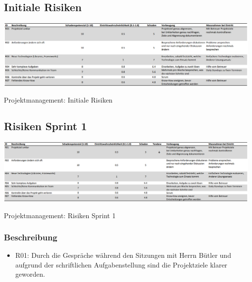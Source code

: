 \begin{landscape}
  \subsection{Initiale Risiken}
  	\begin{table}[H]		
		\includegraphics[width=\linewidth, keepaspectratio]{risiken/Initiales-Risikomanagement.png}
		\caption{Projektmanagement: Initiale Risiken}
	\end{table}
  	\vfill
\end{landscape}
  	   
\begin{landscape}  	   
  \subsection{Risiken Sprint 1}
  	\begin{table}[H]		
  	    \centering	
		\includegraphics[width=\linewidth,keepaspectratio]{risiken/Risiken-Sprint-1.png}
		\caption{Projektmanagement: Risiken Sprint 1}
	\end{table}
	
	\subsubsection{Beschreibung}
	\begin{itemize}
		\item R01: Durch die Gespräche während den Sitzungen mit Herrn Bütler und aufgrund der schriftlichen Aufgabenstellung sind die Projektziele klarer geworden.
	\end{itemize}
	
\end{landscape}

